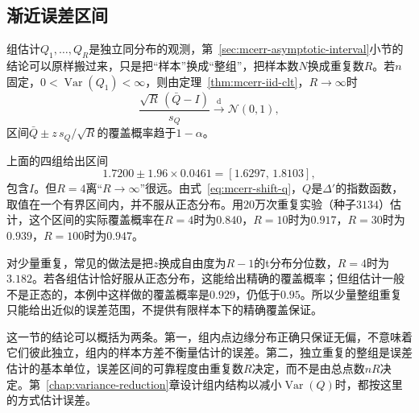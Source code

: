 \subsection{渐近误差区间}
\label{sec:mcerr-replication-interval}

组估计$Q_1,\dots,Q_R$是独立同分布的观测，第~\ref{sec:mcerr-asymptotic-interval}小节的结论可以原样搬过来，只是把“样本”换成“整组”，把样本数$N$换成重复数$R$。若$n$固定，$0<\operatorname{Var}(Q_1)<\infty$，则由定理~\ref{thm:mcerr-iid-clt}，$R\to\infty$时
\begin{equation}
 \frac{\sqrt{R}\,(\bar{Q}-I)}{s_Q}\xrightarrow{\mathrm{d}}\mathcal{N}(0,1) ,
 \label{eq:mcerr-replication-clt}
\end{equation}
区间$\bar{Q}\pm z\,s_Q/\sqrt{R}$的覆盖概率趋于$1-\alpha$。

上面的四组给出区间
\[
 1.7200\pm1.96\times0.0461=[1.6297,\,1.8103] ,
\]
包含$I$。但$R=4$离“$R\to\infty$”很远。由式~\eqref{eq:mcerr-shift-q}，$Q$是$\Delta'$的指数函数，取值在一个有界区间内，并不服从正态分布。用$20$万次重复实验（种子$3134$）估计，这个区间的实际覆盖概率在$R=4$时为$0.840$，$R=10$时为$0.917$，$R=30$时为$0.939$，$R=100$时为$0.947$。

对少量重复，常见的做法是把$z$换成自由度为$R-1$的t分布分位数，$R=4$时为$3.182$。若各组估计恰好服从正态分布，这能给出精确的覆盖概率；但组估计一般不是正态的，本例中这样做的覆盖概率是$0.929$，仍低于$0.95$。所以少量整组重复只能给出近似的误差范围，不提供有限样本下的精确覆盖保证。

这一节的结论可以概括为两条。第一，组内点边缘分布正确只保证无偏，不意味着它们彼此独立，组内的样本方差不衡量估计的误差。第二，独立重复的整组是误差估计的基本单位，误差区间的可靠程度由重复数$R$决定，而不是由总点数$nR$决定。第~\ref{chap:variance-reduction}章设计组内结构以减小$\operatorname{Var}(Q)$时，都按这里的方式估计误差。

